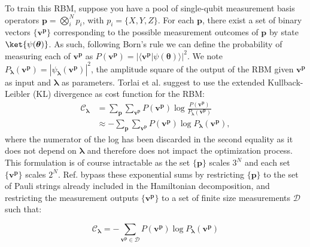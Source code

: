 To train this RBM, suppose you have a pool of single-qubit measurement basis operators $\boldsymbol{p} = \bigotimes_i^N  p_i$, with $p_i = \{ X, Y, Z \}$. For each $\boldsymbol{p}$, there exist a set of binary vectors $\{ \boldsymbol{v}^{\boldsymbol{p}} \}$ corresponding to the possible measurement outcomes of $\boldsymbol{p}$ by state $\ket{\psi(\boldsymbol{\theta})}$. As such, following Born's rule we can define the probability of measuring each of $\boldsymbol{v}^{\boldsymbol{p}}$ as $P(\boldsymbol{v}^{\boldsymbol{p}}) = | \langle \boldsymbol{v}^{\boldsymbol{p}} | \psi(\boldsymbol{\theta}) \rangle |^2 $. We note $P_{\boldsymbol{\lambda}}(\boldsymbol{v}^{\boldsymbol{p}}) = |\psi_{\boldsymbol{\lambda}}(\boldsymbol{v}^{\boldsymbol{p}})|^2$, the amplitude square of the output of the RBM given $\boldsymbol{v}^{\boldsymbol{p}}$ as input and $\boldsymbol{\lambda}$ as parameters. Torlai et al. \cite{Torlai2020} suggest to use the extended Kullback-Leibler (KL) divergence as cost function for the RBM: 
\begin{align}
    \mathcal{C}_{\boldsymbol{\lambda}} &= \sum_{\boldsymbol{p}} \sum_{\boldsymbol{v}^{\boldsymbol{p}}} P(\boldsymbol{v}^{\boldsymbol{p}}) \log \frac{P(\boldsymbol{v}^{\boldsymbol{p}})}{P_{\boldsymbol{\lambda}}(\boldsymbol{v}^{\boldsymbol{p}})}  \nonumber \\
    & \approx - \sum_{\boldsymbol{p}} \sum_{\boldsymbol{v}^{\boldsymbol{p}}} P(\boldsymbol{v}^{\boldsymbol{p}}) \log P_{\boldsymbol{\lambda}}(\boldsymbol{v}^{\boldsymbol{p}}),
\end{align}
where the numerator of the log has been discarded in the second equality as it does not depend on $\boldsymbol{\lambda}$ and therefore does not impact the optimization process. This formulation is of course intractable as the set $\{ \boldsymbol{p} \}$ scales $3^N$ and each set $\{ \boldsymbol{v}^{\boldsymbol{p}} \}$ scales $2^N$. Ref. \cite{Torlai2020} bypass these exponential sums by restricting  $\{ \boldsymbol{p} \}$  to the set of Pauli strings already included in the Hamiltonian decomposition, and restricting the measurement outputs $\{ \boldsymbol{v}^{\boldsymbol{p}} \}$  to a set of finite size measurements $\mathcal{D}$ such that: 

\begin{equation}
    \mathcal{C}_{\boldsymbol{\lambda}} = -  \sum_{\boldsymbol{v}^{\boldsymbol{p}} \in \mathcal{D}} P(\boldsymbol{v}^{\boldsymbol{p}}) \log P_{\boldsymbol{\lambda}}(\boldsymbol{v}^{\boldsymbol{p}})
\end{equation}

